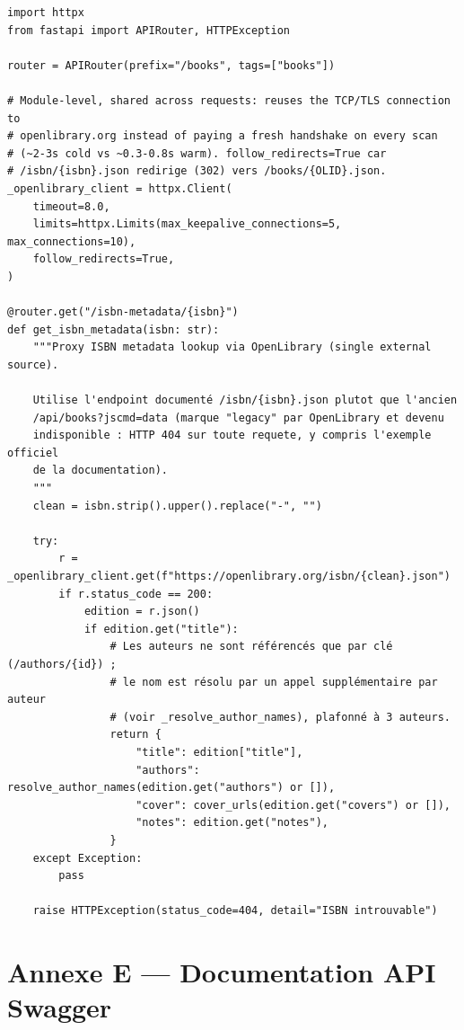 \documentclass[12pt, a4paper]{report}
\renewcommand{\_}{\origunderscore\allowbreak}
\begin{document}
\begin{lstlisting}[style=pythonstyle, caption={Endpoint GET /isbn-metadata/\{isbn\} — Lookup Open Library}, label={lst:isbn}]
import httpx
from fastapi import APIRouter, HTTPException

router = APIRouter(prefix="/books", tags=["books"])

# Module-level, shared across requests: reuses the TCP/TLS connection to
# openlibrary.org instead of paying a fresh handshake on every scan
# (~2-3s cold vs ~0.3-0.8s warm). follow_redirects=True car
# /isbn/{isbn}.json redirige (302) vers /books/{OLID}.json.
_openlibrary_client = httpx.Client(
    timeout=8.0,
    limits=httpx.Limits(max_keepalive_connections=5, max_connections=10),
    follow_redirects=True,
)

@router.get("/isbn-metadata/{isbn}")
def get_isbn_metadata(isbn: str):
    """Proxy ISBN metadata lookup via OpenLibrary (single external source).

    Utilise l'endpoint documenté /isbn/{isbn}.json plutot que l'ancien
    /api/books?jscmd=data (marque "legacy" par OpenLibrary et devenu
    indisponible : HTTP 404 sur toute requete, y compris l'exemple officiel
    de la documentation).
    """
    clean = isbn.strip().upper().replace("-", "")

    try:
        r = _openlibrary_client.get(f"https://openlibrary.org/isbn/{clean}.json")
        if r.status_code == 200:
            edition = r.json()
            if edition.get("title"):
                # Les auteurs ne sont référencés que par clé (/authors/{id}) ;
                # le nom est résolu par un appel supplémentaire par auteur
                # (voir _resolve_author_names), plafonné à 3 auteurs.
                return {
                    "title": edition["title"],
                    "authors": resolve_author_names(edition.get("authors") or []),
                    "cover": cover_urls(edition.get("covers") or []),
                    "notes": edition.get("notes"),
                }
    except Exception:
        pass

    raise HTTPException(status_code=404, detail="ISBN introuvable")
\end{lstlisting}




\section*{Annexe E — Documentation API Swagger}
\end{document}
